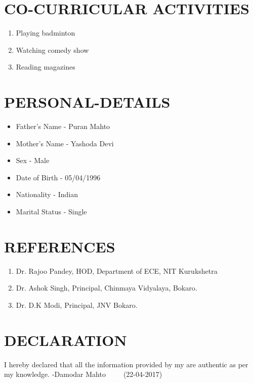 \documentclass[11pt,a4paper,sans]{moderncv}
\begin{document}
\section{CO-CURRICULAR ACTIVITIES}
\begin{enumerate}
\item Playing badminton
\item Watching comedy show
\item Reading magazines
\end{enumerate}

\section{PERSONAL-DETAILS}
\begin{itemize}
\item Father's Name - Puran Mahto
\item Mother's Name - Yashoda Devi
\item Sex - Male
\item Date of Birth - 05/04/1996
\item Nationality - Indian
\item Marital Status - Single
\end{itemize}

\section{REFERENCES}
\begin{enumerate}
\item Dr. Rajoo Pandey, HOD, Department of ECE, NIT Kurukshetra
\item Dr. Ashok Singh, Principal, Chinmaya Vidyalaya, Bokaro.
\item Dr. D.K Modi, Principal, JNV Bokaro.
\end{enumerate}

\section{DECLARATION}
I hereby declared that all the information provided by my are authentic as per my knowledge. 
\newline \newline     -Damodar Mahto\newline\ \ \ \ \ (22-04-2017)
\clearpage
\end{document}
